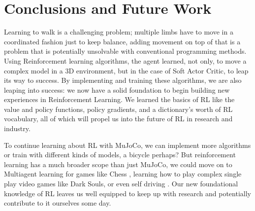 \documentclass[conference]{IEEEtran}
\begin{document}
\blindtext

\section{Conclusions and Future Work}

Learning to walk is a challenging problem; multiple limbs have to move in a coordinated fashion just to keep balance, adding movement on top of that is a problem that is potentially unsolvable with conventional programming methods. Using Reinforcement learning algorithms, the agent learned, not only, to move a complex model in a 3D environment, but in the case of Soft Actor Critic, to leap its way to success. By implementing and training these algorithms, we are also leaping into success: we now have a solid foundation to begin building new experiences in Reinforcement Learning. We learned the basics of RL like the value and policy functions, policy gradients, and a dictionary's worth of RL vocabulary, all of which will propel us into the future of RL in research and industry.

To continue learning about RL with MuJoCo, we can implement more algorithms or train with different kinds of models, a bicycle perhaps? But reinforcement learning has a much broader scope than just MuJoCo, we could move on to Multiagent learning for games like Chess \cite{multiagent}, learning how to play complex single play video games like Dark Souls, or even self driving \cite{self_driving}. Our new foundational knowledge of RL leaves us well equipped to keep up with research and potentially contribute to it ourselves some day.



\end{document}
